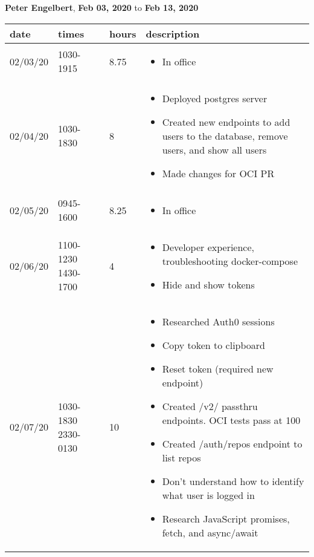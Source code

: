 \documentclass[10pt,twoside,letterpaper]{article}
\begin{document}
\begin{center}
\quad \textbf{Peter Engelbert},
\quad \textbf{Feb 03, 2020} to \textbf{Feb 13, 2020}
    \begin{longtable}{ m{2cm} | m{2cm} | m{2cm} || m{8cm} }
        date & times & hours & description \\
    \hline\hline
		02/03/20 & 
			1030-1915
			& 8.75 & 
			\begin{itemize}[topsep=0pt] \itemsep0em
			\item In office
			\end{itemize}
			\\ \hline
		02/04/20 & 
			1030-1830
			& 8 & 
			\begin{itemize}[topsep=0pt] \itemsep0em
			\item Deployed postgres server
			\item Created new endpoints to add users to the database, remove users, and show all users
			\item Made changes for OCI PR
			\end{itemize}
			\\ \hline
		02/05/20 & 
			0945-1600
			& 8.25 & 
			\begin{itemize}[topsep=0pt] \itemsep0em
			\item In office
			\end{itemize}
			\\ \hline
		02/06/20 & 
			1100-1230
			1430-1700
			& 4 & 
			\begin{itemize}[topsep=0pt] \itemsep0em
			\item Developer experience, troubleshooting docker-compose
			\item Hide and show tokens
			\end{itemize}
			\\ \hline
		02/07/20 & 
			1030-1830
			2330-0130
			& 10 & 
			\begin{itemize}[topsep=0pt] \itemsep0em
			\item Researched Auth0 sessions
			\item Copy token to clipboard
			\item Reset token (required new endpoint)
			\item Created /v2/ passthru endpoints. OCI tests pass at 100%
			\item Created /auth/repos endpoint to list repos
			\item Don’t understand how to identify what user is logged in
			\item Research JavaScript promises, fetch, and async/await

\end{itemize}
\end{longtable}
\end{center}
\end{document}
